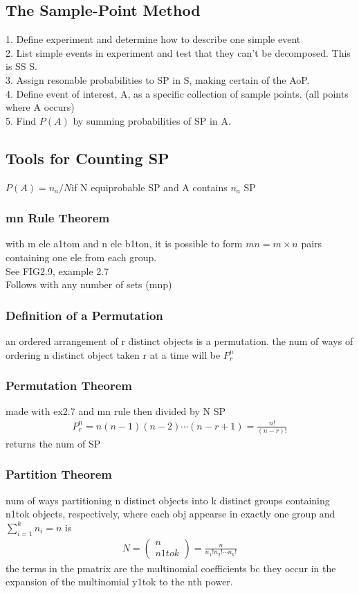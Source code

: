 \documentclass[12pt]{article}
\begin{document}
\subsection{The Sample-Point Method}
    1. Define experiment and determine how to describe one simple event\\
    2. List simple events in experiment and test that they can't be
    decomposed. This is SS S.\\
    3. Assign resonable probabilities to SP in S, making certain of the AoP.\\
    4. Define event of interest, A, as a specific collection of
    sample points. (all points where A occurs)\\
    5. Find $ P(A) $ by summing probabilities of SP in A.
\subsection{Tools for Counting SP}
     $ P(A) = n_{a}/N $if N equiprobable SP and A contains $ n_{a} $ SP
    \subsubsection{mn Rule Theorem}
        with m ele a1tom and n ele b1ton, it is possible to form
        $ mn = m \times n $ pairs containing one ele from each group.\\
        See FIG2.9, example 2.7 \\
        Follows with any number of sets (mnp)
    \subsubsection{Definition of a Permutation}
        an ordered arrangement of r distinct objects is a permutation.
        the num of ways of ordering n distinct object taken r at a time
        will be $ P^{n}_{r} $
    \subsubsection{Permutation Theorem}
        made with ex2.7 and mn rule then divided by N SP
        \begin{align*}
            P_{r}^{n} = n(n-1)(n-2)\cdots(n-r+1) = \frac{n!}{(n-r)!}
        \end{align*}
        returns the num of SP
    \subsubsection{Partition Theorem}
        num of ways partitioning n distinct objects into k distinct groups
        containing n1tok objects, respectively, where each obj appearse
        in exactly one group and $ \sum_{i= 1}^{k}n_{i} = n$ is
        \begin{align*}
            N = \begin{pmatrix}
                n \\ n1tok
            \end{pmatrix} =  \frac{n}{n_{1}!n_{2}!\cdots n_{k}!}
        \end{align*}
        the terms in the pmatrix are the multinomial coefficients 
        bc they occur in the expansion of the multinomial y1tok to
        the nth power.
\end{document}

